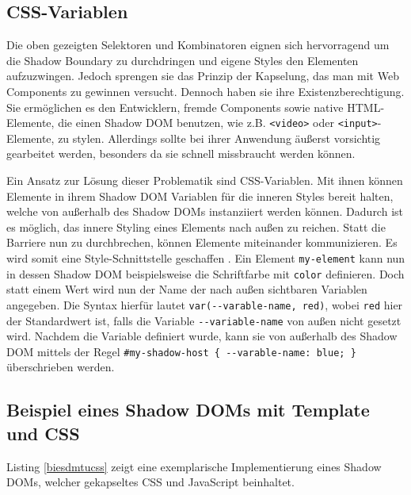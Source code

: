 \subsection{CSS-Variablen}\label{css-variablen}

Die oben gezeigten Selektoren und Kombinatoren eignen sich hervorragend um die Shadow Boundary zu durchdringen und eigene Styles den Elementen aufzuzwingen. Jedoch sprengen sie das Prinzip der Kapselung, das man mit Web Components zu gewinnen versucht. Dennoch haben sie ihre Existenzberechtigung. Sie ermöglichen es den Entwicklern, fremde Components sowie native \ac{HTML}-Elemente, die einen Shadow \ac{DOM} benutzen, wie z.B. \texttt{\textless{}video\textgreater{}} oder \texttt{\textless{}input\textgreater{}}-Elemente, zu stylen. Allerdings sollte bei ihrer Anwendung äußerst vorsichtig gearbeitet werden, besonders da sie schnell missbraucht werden können.

Ein Ansatz zur Lösung dieser Problematik sind \ac{CSS}-Variablen. Mit ihnen können Elemente in ihrem Shadow \ac{DOM} Variablen für die inneren Styles bereit halten, welche von außerhalb des Shadow \ac{DOM}s instanziiert werden können. Dadurch ist es möglich, das innere Styling eines Elements nach außen zu reichen. Statt die Barriere nun zu durchbrechen, können Elemente miteinander kommunizieren. Es wird somit eine Style-Schnittstelle geschaffen \cite{citeulike:13883381}. Ein Element \texttt{my-element} kann nun in dessen Shadow \ac{DOM} beispielsweise die Schriftfarbe mit \texttt{color} definieren. Doch statt einem Wert wird nun der Name der nach außen sichtbaren Variablen angegeben. Die Syntax hierfür lautet \texttt{var(-\/-varable-name,\ red)}, wobei \texttt{red} hier der Standardwert ist, falls die Variable \texttt{-\/-variable-name} von außen nicht gesetzt wird. Nachdem die Variable definiert wurde, kann sie von außerhalb des Shadow \ac{DOM} mittels der Regel \texttt{\#my-shadow-host\ \{\ -\/-varable-name:\ blue;\ \}} überschrieben werden.


\newpage
\subsection{Beispiel eines Shadow DOMs mit Template und CSS}\label{beispiel-eines-shadow-doms-mit-template-und-css}

Listing \ref{biesdmtucss} zeigt eine exemplarische Implementierung eines Shadow \ac{DOM}s, welcher gekapseltes \ac{CSS} und JavaScript beinhaltet.



